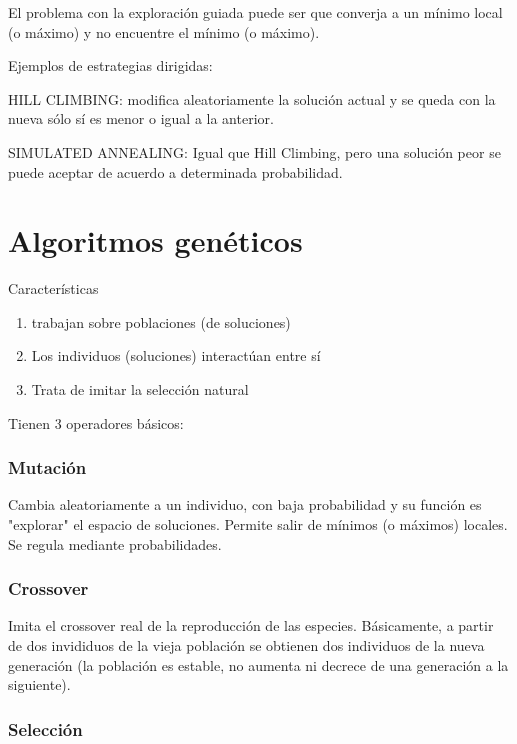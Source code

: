 \documentclass[10pt,a4paper]{article}
\begin{document}
El problema con la exploración guiada puede ser que converja a un mínimo local (o máximo) y no encuentre el mínimo (o máximo).

Ejemplos de estrategias dirigidas:

HILL CLIMBING: modifica aleatoriamente la solución actual y se queda con la nueva sólo sí es menor o igual a la anterior.

SIMULATED ANNEALING: Igual que Hill Climbing, pero una solución peor se puede aceptar de acuerdo a determinada probabilidad.

\section*{Algoritmos genéticos}

Características

\begin{enumerate}

	\item trabajan sobre poblaciones (de soluciones)
	\item Los individuos (soluciones) interactúan entre sí
	\item Trata de imitar la selección natural
\end{enumerate}

Tienen 3 operadores básicos:

\subsubsection*{Mutación}

Cambia aleatoriamente a un individuo, con baja probabilidad y su función es "explorar" el espacio de soluciones. Permite salir de mínimos (o máximos) locales. Se regula mediante probabilidades.

\subsubsection*{Crossover}

Imita el crossover real de la reproducción de las especies. Básicamente, a partir de dos invididuos de la vieja población se obtienen dos individuos de la nueva generación (la población es estable, no aumenta ni decrece de una generación a la siguiente).

\subsubsection*{Selección}
\end{document}
